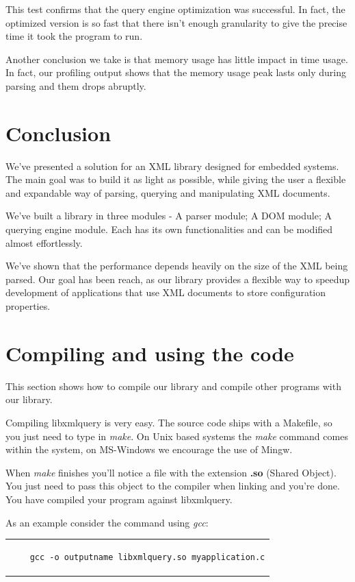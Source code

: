 \documentclass[a4paper]{report}
\begin{document}
	This test confirms that the query engine optimization was successful. In fact, the optimized version is so fast that there isn't enough granularity to give the precise time it took the program to run.

	Another conclusion we take is that memory usage has little impact in time usage. In fact, our profiling output shows that the memory usage peak lasts only during parsing and them drops abruptly.

\chapter{Conclusion} \label{chap:concl}
	We've presented a solution for an XML library designed for embedded systems. The main goal was to build it as light as possible, while giving the user a flexible and expandable way of parsing, querying and manipulating XML documents.

	We've built a library in three modules - A parser module; A DOM module; A querying engine module. Each has its own functionalities and can be modified almost effortlessly.

	We've shown that the performance depends heavily on the size of the XML being parsed. Our goal has been reach, as our library provides a flexible way to speedup development of applications that use XML documents
	to store configuration properties.


\appendix
\chapter{Compiling and using the code}\label{chap:gcc}
	This section shows how to compile our library and compile other programs with our library.

	Compiling libxmlquery is very easy. The source code ships with a Makefile, so you just need to type in \emph{make}. On Unix based systems the \emph{make} command comes within the system, on MS-Windows we encourage the use of Mingw.

	When \emph{make} finishes you'll notice a file with the extension \textbf{.so} (Shared Object). You just need to pass this object to the compiler when linking and you're done. You have compiled your program against
	libxmlquery.

	As an example consider the command using \emph{gcc}:

	\begin{center}
	\lstset{language=bash,caption=Compiling a program against our library, captionpos=b}
	\begin{tabular}{c}
	\begin{lstlisting}
	gcc -o outputname libxmlquery.so myapplication.c
	\end{lstlisting}
	\end{tabular}
	\end{center}
\end{document}
